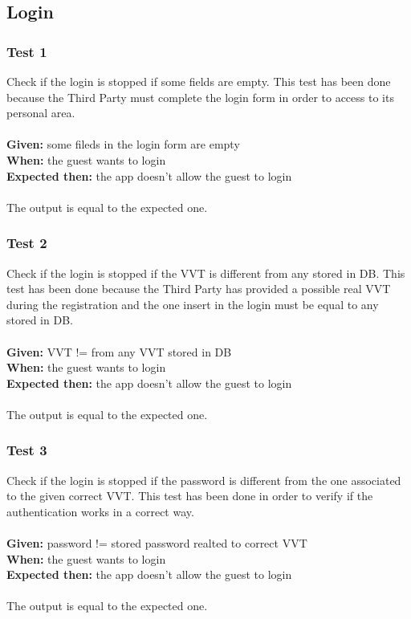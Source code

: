 \subsection{Login}
\subsubsection{\Large{Test 1}}
Check if the login is stopped if some fields are empty. This test has been done because the Third Party must complete the login form in order to access to its personal area.\\
\\
\textbf{Given: } some fileds in the login form are empty\\
\textbf{When: } the guest wants to login\\
\textbf{Expected then: } the app doesn't allow the guest to login\\
\\
The output is equal to the expected one.

\subsubsection{\Large{Test 2}}
Check if the login is stopped if the VVT is different from any stored in DB. This test has been done because the Third Party has provided a possible real VVT during the registration and the one insert in the login must be equal to any stored in DB.\\
\\
\textbf{Given: } VVT != from any VVT stored in DB\\
\textbf{When: } the guest wants to login\\
\textbf{Expected then: } the app doesn't allow the guest to login\\
\\
The output is equal to the expected one.

\subsubsection{\Large{Test 3}}
Check if the login is stopped if the password is different from the one associated to the given correct VVT. This test has been done in order to verify if the authentication works in a correct way.\\
\\
\textbf{Given: } password != stored password realted to correct VVT\\
\textbf{When: } the guest wants to login\\
\textbf{Expected then: } the app doesn't allow the guest to login\\
\\
The output is equal to the expected one.

